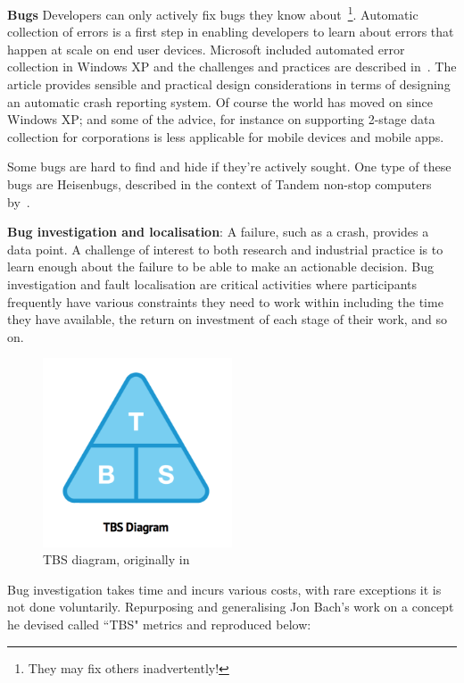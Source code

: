 \textbf{Bugs} Developers can only actively fix bugs they know about~\footnote{They may fix others inadvertently!}. Automatic collection of errors is a first step in enabling developers to learn about errors that happen at scale on end user devices. Microsoft included automated error collection in Windows XP and the challenges and practices are described in~\citep{murphy2004_automating_software_failure_reporting}. The article provides sensible and practical design considerations in terms of designing an automatic crash reporting system. Of course the world has moved on since Windows XP; and some of the advice, for instance on supporting 2-stage data collection for corporations is less applicable for mobile devices and mobile apps. 

Some bugs are hard to find and hide if they're actively sought. One type of these bugs are Heisenbugs, described in the context of Tandem non-stop computers by~\citep{gray1986_why_do_computers_stop_and_what_can_be_done_about_it}.

\textbf{Bug investigation and localisation}: A failure, such as a crash, provides a data point. A challenge of interest to both research and industrial practice is to learn enough about the failure to be able to make an actionable decision. Bug investigation and fault localisation 
are critical activities where participants frequently have various constraints they need to work within including the time they have available, the return on investment of each stage of their work, and so on.

\begin{figure}
    \centering
    \includegraphics[width = 0.5\textwidth]{images/mobile-analytics-playbook/TBS.png}
    \caption{TBS diagram, originally in~\citep{harty_aymer_playbook_2016}}
    \label{fig:my_tbs_diagram}
\end{figure}

Bug investigation takes time and incurs various costs, with rare exceptions it is not done voluntarily. Repurposing and generalising Jon Bach's work on a concept he devised called ``TBS" metrics and reproduced below:

